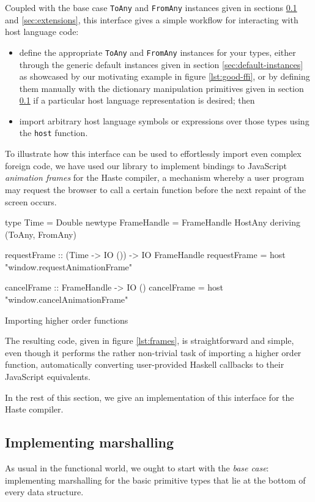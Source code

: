 \documentclass{sigplanconf}
\begin{document}
Coupled with the base case \lstinline!ToAny! and \lstinline!FromAny! instances
given in sections \ref{sec:marshalling} and \ref{sec:extensions}, this
interface gives a simple workflow for interacting with host language code:
\begin{itemize}
\item
  define the appropriate \lstinline!ToAny! and \lstinline!FromAny! instances
  for your types, either through the generic default instances given in section
  \ref{sec:default-instances} as showcased by our motivating example in figure
  \ref{lst:good-ffi}, or by defining them manually with the dictionary
  manipulation primitives given in section \ref{sec:marshalling} if a
  particular host language representation is desired; then
\item
  import arbitrary host language symbols or expressions over
  those types using the \lstinline!host! function.
\end{itemize}

To illustrate how this interface can be used to effortlessly import even
complex foreign code, we have used our library to
implement bindings to JavaScript \emph{animation frames} for the Haste
compiler, a mechanism whereby a user program may request the browser to call
a certain function before the next repaint of the screen occurs.

\begin{listingfloat}
\begin{code}
  type Time = Double
  newtype FrameHandle = FrameHandle HostAny
    deriving (ToAny, FromAny)

  requestFrame :: (Time -> IO ()) -> IO FrameHandle
  requestFrame = host "window.requestAnimationFrame"

  cancelFrame :: FrameHandle -> IO ()
  cancelFrame = host "window.cancelAnimationFrame"
\end{code}
\caption{Importing higher order functions}
\label{lst:frames}
\end{listingfloat}

The resulting code, given in figure \ref{lst:frames}, is straightforward and
simple, even though it performs the rather non-trivial task of importing a
higher order function, automatically
converting user-provided Haskell callbacks to their JavaScript equivalents.

In the rest of this section, we give an implementation of this interface for
the Haste compiler.

\subsection{Implementing marshalling}\label{sec:marshalling}
As usual in the functional world, we ought to start with the \emph{base case}:
implementing marshalling for the basic primitive types that lie at the bottom
of every data structure.
\end{document}
